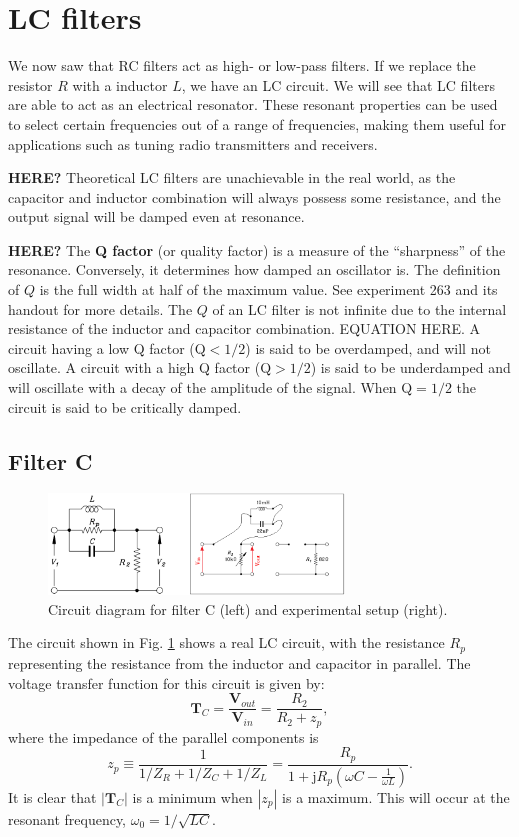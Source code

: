 \documentclass{article}
\begin{document}
\section{LC filters}
We now saw that RC filters act as high- or low-pass filters. If we
replace the resistor $R$ with a inductor $L$, we have an LC circuit.
We will see that LC filters are able to act as an electrical
resonator. These resonant properties can be used to select certain
frequencies out of a range of frequencies, making them useful for
applications such as tuning radio transmitters and receivers.

{\bf HERE?} Theoretical LC filters are unachievable in the real world,
as the capacitor and inductor combination will always possess some
resistance, and the output signal will be damped even at resonance.

{\bf HERE?} The \textbf{Q factor} (or quality factor) is a measure of the
``sharpness'' of the resonance. Conversely, it determines how damped
an oscillator is. The definition of $Q$ is the full width at half of
the maximum value. See experiment 263 and its handout for more
details. The $Q$ of an LC filter is not infinite due to the internal
resistance of the inductor and capacitor combination. EQUATION HERE. A
circuit having a low Q factor (Q$<1/2$) is said to be overdamped, and
will not oscillate. A circuit with a high Q factor (Q$>1/2$) is said
to be underdamped and will oscillate with a decay of the amplitude of
the signal. When Q$=1/2$ the circuit is said to be critically damped.

\subsection{Filter C}
\begin{figure}
  \centering
  \includegraphics[width=0.7\textwidth]{images/filterC.png}
  \caption{Circuit diagram for filter C (left) and experimental setup
    (right).}
  \label{fig:lc1}
\end{figure}
The circuit shown in Fig. \ref{fig:lc1} shows a real LC circuit, with
the resistance $R_p$ representing the resistance from the inductor and
capacitor in parallel. The voltage transfer function for this circuit
is given by:
\begin{equation}
  \mathbf{T}_C=\frac{\mathbf{V}_{out}}{\mathbf{V}_{in}}=\frac{R_2}{R_2+z_p},
\end{equation}
where the impedance of the parallel components is 
\begin{equation}
  z_p\equiv \frac{1}{1/Z_R+1/Z_C+1/Z_L}=\frac{R_p}{1+\mathrm{j}R_p\left(\omega C - \frac{1}{\omega L}\right)}.
\end{equation}
It is clear that $|\mathbf{T}_C|$ is a minimum when $|z_p|$ is a
maximum. This will occur at the resonant
frequency, %
$\omega_0=1/\sqrt{LC}$.
\end{document}
